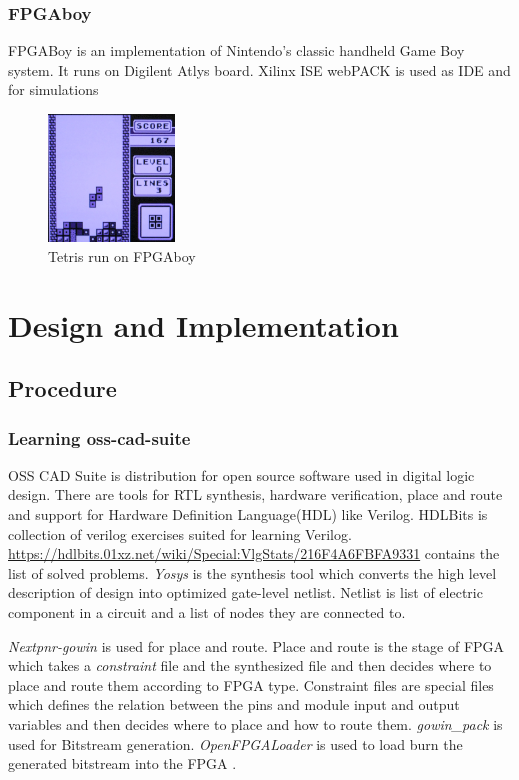 \documentclass[a4paper,12pt]{article}
\begin{document}
    \subsubsection{FPGAboy} 
    FPGABoy is an implementation of Nintendo's classic handheld Game Boy system. It runs on Digilent Atlys board. Xilinx ISE webPACK is used as IDE and for simulations
    \begin{figure}[h]
    \centering
    \includegraphics[width=0.3\textwidth]{images/fpgaboy.png} 
    \caption{Tetris run on FPGAboy}
    \end{figure} 
    \newpage
    \section{Design and Implementation}
    \subsection{Procedure}

    \subsubsection{Learning oss-cad-suite}
    OSS CAD Suite is distribution for open source software used in digital logic design.
    There are tools for RTL synthesis, hardware verification, place and route and support for Hardware Definition Language(HDL) like Verilog. HDLBits is collection of verilog exercises suited for learning Verilog. \url{https://hdlbits.01xz.net/wiki/Special:VlgStats/216F4A6FBFA9331} contains the list of solved problems. \textit{Yosys} is the synthesis tool which converts the high level description of design into optimized gate-level netlist. Netlist is list of electric component in a circuit and a list of nodes they are connected to.
    
    \textit{Nextpnr-gowin} is used for place and route. Place and route is the stage of FPGA which takes a \textit{constraint} file and the synthesized file and then decides where to place and route them according to FPGA type. Constraint files are special files which defines the relation between the pins and module input and output variables and then decides where to place and how to route them. \textit{gowin\_pack} is used for Bitstream generation. \textit{OpenFPGALoader} is used to load burn the generated bitstream into the FPGA .
    
\end{document}
